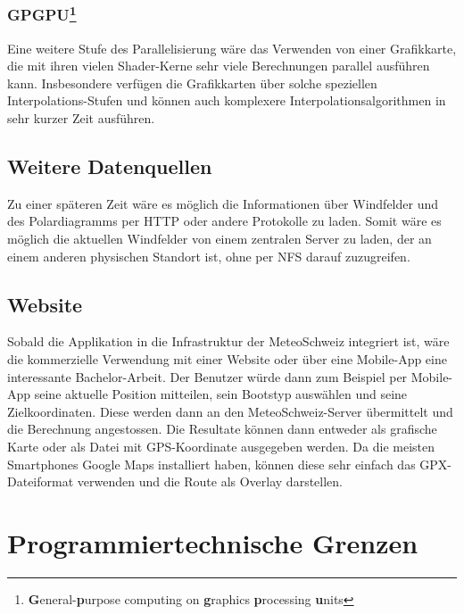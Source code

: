 \subsubsection{GPGPU\protect\footnote{\textbf{G}eneral-\textbf{p}urpose computing on \textbf{g}raphics \textbf{p}rocessing \textbf{u}nits}}
Eine weitere Stufe des Parallelisierung wäre das Verwenden von einer
Grafikkarte, die mit ihren vielen Shader-Kerne sehr viele Berechnungen
parallel ausführen kann. Insbesondere verfügen die Grafikkarten über solche
speziellen Interpolations-Stufen und können auch komplexere
Interpolationsalgorithmen in sehr kurzer Zeit ausführen.
 
\subsection{Weitere Datenquellen}
Zu einer späteren Zeit wäre es möglich die Informationen über Windfelder und
des Polardiagramms per HTTP oder andere Protokolle zu laden. Somit wäre es
möglich die aktuellen Windfelder von einem zentralen Server zu laden, der an
einem anderen physischen Standort ist, ohne per NFS darauf zuzugreifen.

\subsection{Website}
Sobald die Applikation in die Infrastruktur der MeteoSchweiz integriert ist,
wäre die kommerzielle Verwendung mit einer Website oder über eine Mobile-App
eine interessante Bachelor-Arbeit. Der Benutzer würde dann zum Beispiel per
Mobile-App seine aktuelle Position mitteilen, sein Bootstyp auswählen und
seine Zielkoordinaten. Diese werden dann an den MeteoSchweiz-Server
übermittelt und die Berechnung angestossen. Die Resultate können dann entweder
als grafische Karte oder als Datei mit GPS-Koordinate ausgegeben werden. Da
die meisten Smartphones Google Maps installiert haben, können diese sehr
einfach das GPX-Dateiformat verwenden und die Route als Overlay darstellen.

\section{Programmiertechnische Grenzen}
